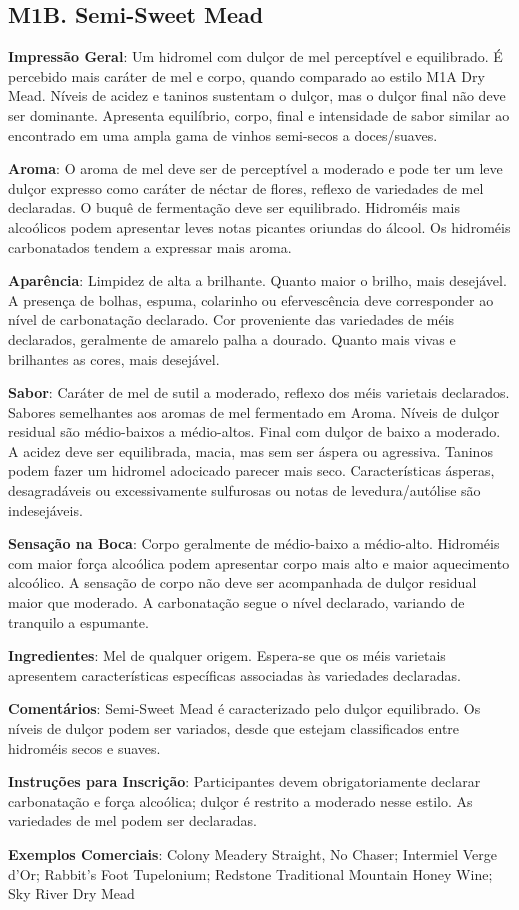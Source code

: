 \subsection*{M1B. Semi-Sweet Mead}

\textbf{Impressão Geral}: Um hidromel com dulçor de mel perceptível e equilibrado. É percebido mais caráter de mel e corpo, quando comparado ao estilo M1A Dry Mead. Níveis de acidez e taninos sustentam o dulçor, mas o dulçor final não deve ser dominante. Apresenta equilíbrio, corpo, final e intensidade de sabor similar ao encontrado em uma ampla gama de vinhos semi-secos a doces/suaves.

\textbf{Aroma}: O aroma de mel deve ser de perceptível a moderado e pode ter um leve dulçor expresso como caráter de néctar de flores, reflexo de variedades de mel declaradas. O buquê de fermentação deve ser equilibrado. Hidroméis mais alcoólicos podem apresentar leves notas picantes oriundas do álcool. Os hidroméis carbonatados tendem a expressar mais aroma.

\textbf{Aparência}: Limpidez de alta a brilhante. Quanto maior o brilho, mais desejável. A presença de bolhas, espuma, colarinho ou efervescência deve corresponder ao nível de carbonatação declarado. Cor proveniente das variedades de méis declarados, geralmente de amarelo palha a dourado. Quanto mais vivas e brilhantes as cores, mais desejável.

\textbf{Sabor}: Caráter de mel de sutil a moderado, reflexo dos méis varietais declarados. Sabores semelhantes aos aromas de mel fermentado em Aroma. Níveis de dulçor residual são médio-baixos a médio-altos. Final com dulçor de baixo a moderado. A acidez deve ser equilibrada, macia, mas sem ser áspera ou agressiva. Taninos podem fazer um hidromel adocicado parecer mais seco. Características ásperas, desagradáveis ou excessivamente sulfurosas ou notas de levedura/autólise são indesejáveis.

\textbf{Sensação na Boca}: Corpo geralmente de médio-baixo a médio-alto. Hidroméis com maior força alcoólica podem apresentar corpo mais alto e maior aquecimento alcoólico. A sensação de corpo não deve ser acompanhada de dulçor residual maior que moderado. A carbonatação segue o nível declarado, variando de tranquilo a espumante.

\textbf{Ingredientes}: Mel de qualquer origem. Espera-se que os méis varietais apresentem características específicas associadas às variedades declaradas.

\textbf{Comentários}: Semi-Sweet Mead é caracterizado pelo dulçor equilibrado. Os níveis de dulçor podem ser variados, desde que estejam classificados entre hidroméis secos e suaves.

\textbf{Instruções para Inscrição}: Participantes devem obrigatoriamente declarar carbonatação e força alcoólica; dulçor é restrito a moderado nesse estilo. As variedades de mel podem ser declaradas.

\textbf{Exemplos Comerciais}: Colony Meadery Straight, No Chaser; Intermiel Verge d'Or; Rabbit's Foot Tupelonium; Redstone Traditional Mountain Honey Wine; Sky River Dry Mead
